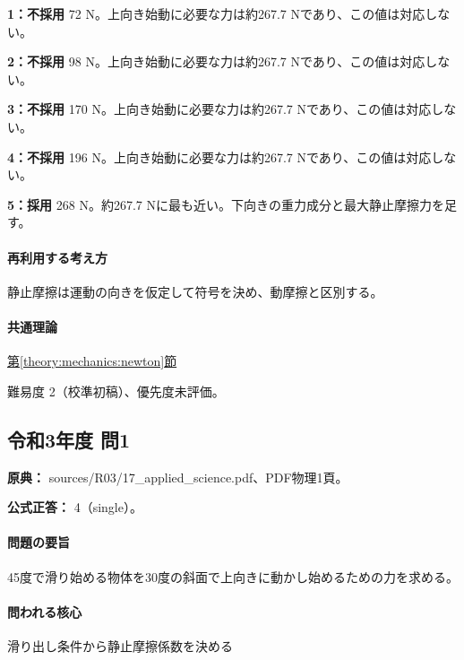\noindent\textbf{1：不採用} 72 N。上向き始動に必要な力は約267.7 Nであり、この値は対応しない。\par

\noindent\textbf{2：不採用} 98 N。上向き始動に必要な力は約267.7 Nであり、この値は対応しない。\par

\noindent\textbf{3：不採用} 170 N。上向き始動に必要な力は約267.7 Nであり、この値は対応しない。\par

\noindent\textbf{4：不採用} 196 N。上向き始動に必要な力は約267.7 Nであり、この値は対応しない。\par

\noindent\textbf{5：採用} 268 N。約267.7 Nに最も近い。下向きの重力成分と最大静止摩擦力を足す。\par

\paragraph{再利用する考え方} 静止摩擦は運動の向きを仮定して符号を決め、動摩擦と区別する。

\paragraph{共通理論} \hyperref[theory:mechanics:newton]{第\ref*{theory:mechanics:newton}節}

\par 難易度 2（校準初稿）、優先度未評価。

\subsection{令和3年度 問1}
\label{q:r03-reg-applied-01}

\noindent\textbf{原典：} sources/R03/17\_applied\_science.pdf、PDF物理1頁。

\textbf{公式正答：} 4（single）。

\paragraph{問題の要旨} 45度で滑り始める物体を30度の斜面で上向きに動かし始めるための力を求める。

\paragraph{問われる核心} 滑り出し条件から静止摩擦係数を決める


